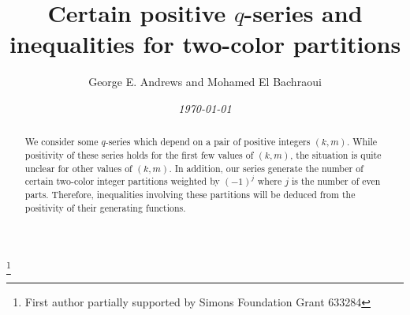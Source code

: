 \documentclass[reqno]{amsart}
\title[Positive $q$-series and inequalities]{Certain positive $q$-series and inequalities for two-color partitions}
\theoremstyle{definition}
\theoremstyle{plain}
\theoremstyle{remark}
\numberwithin{equation}{section}
\begin{document}
\author[ G. E. Andrews and M. El Bachraoui]{George E. Andrews and Mohamed El Bachraoui}
\address{The Pennsylvania State University, University Park, Pennsylvania 16802}
\address{Dept. Math. Sci,
United Arab Emirates University, PO Box 15551, Al-Ain, UAE}
%
\begin{abstract}
We consider some $q$-series which depend on a pair of positive integers $(k,m)$.
While positivity of these series holds for the first few values of $(k,m)$, the situation is quite unclear for other values of $(k,m)$.
In addition, our series generate the number of certain two-color integer partitions weighted by $(-1)^j$ where $j$ is the number of even parts.
Therefore, inequalities involving these partitions will be deduced from the positivity of their generating functions.

\end{abstract}
\date{\textit{\today}}
\thanks{First author partially supported by Simons Foundation Grant 633284}
\maketitle
%
\end{document}
